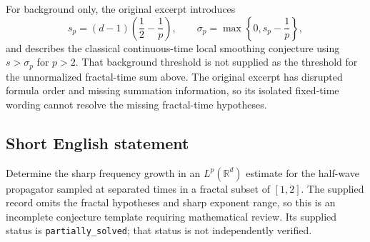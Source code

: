 \documentclass[11pt]{article}
\newcommand{\R}{\mathbb{R}}
\begin{document}
For background only, the original excerpt introduces
\[
s_p=(d-1)\left(\frac12-\frac1p\right),
\qquad
\sigma_p=\max\left\{0,s_p-\frac1p\right\},
\]
and describes the classical continuous-time local smoothing conjecture using \(s>\sigma_p\) for \(p>2\). That background threshold is not supplied as the threshold for the unnormalized fractal-time sum above. The original excerpt has disrupted formula order and missing summation information, so its isolated fixed-time wording cannot resolve the missing fractal-time hypotheses.
\subsection{Short English statement}
Determine the sharp frequency growth in an \(L^p(\R^d)\) estimate for the half-wave propagator sampled at separated times in a fractal subset of \([1,2]\). The supplied record omits the fractal hypotheses and sharp exponent range, so this is an incomplete conjecture template requiring mathematical review. Its supplied status is \texttt{partially\_solved}; that status is not independently verified.
\end{document}
